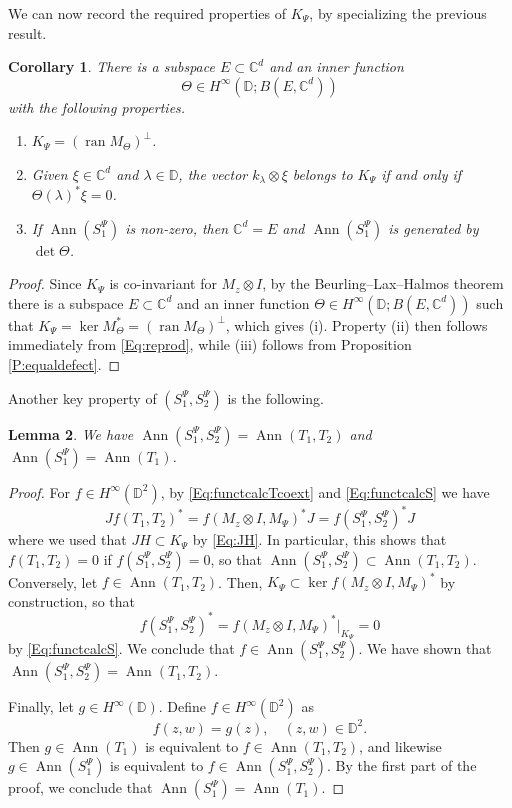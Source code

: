 \documentclass[10pt]{amsart}
\newcommand{\bC}{{\mathbb{C}}}
\newcommand{\bD}{{\mathbb{D}}}
\newcommand{\ran}{\operatorname{ran}}
\newcommand{\Ann}{\operatorname{Ann}}
\newtheorem{lemma}{Lemma}[section]
\newtheorem{corollary}[lemma]{Corollary}
\theoremstyle{definition}
\begin{document}
We can now record the required properties of $K_\Psi$, by specializing the previous result.

\begin{corollary}\label{C:detK}
There is a subspace $E\subset \bC^d$ and an inner function $$\Theta\in H^\infty(\bD;B(E,\bC^d))$$ with the following properties.
\begin{enumerate}[{\rm (i)}]
\item $K_\Psi=(\ran M_\Theta)^\perp$.
\item Given $\xi\in \bC^d$ and $\lambda\in \bD$, the vector $k_\lambda\otimes \xi$ belongs to $K_\Psi$ if and only if $\Theta(\lambda)^*\xi=0$.
\item If $\Ann(S^\Psi_1)$ is non-zero, then $\bC^d=E$ and $\Ann(S^\Psi_1)$ is generated by  $\det \Theta$.
\end{enumerate}
\end{corollary}
\begin{proof}
Since $K_\Psi$ is co-invariant for $M_z\otimes I$, by the Beurling--Lax--Halmos theorem there is a subspace $E\subset \bC^d$ and an inner function $\Theta\in H^\infty(\bD;B(E,\bC^d))$ such that $K_\Psi=\ker M_\Theta^*=(\ran M_\Theta)^\perp$, which gives (i). Property (ii) then follows immediately from \eqref{Eq:reprod}, while (iii) follows from Proposition \ref{P:equaldefect}.
\end{proof}

Another key property of $(S^\Psi_1,S^\Psi_2)$ is the following.

\begin{lemma}\label{L:AnnS}
We have $\Ann(S^\Psi_1,S^\Psi_2)=\Ann(T_1,T_2)$ and $\Ann(S^\Psi_1)=\Ann(T_1)$.
\end{lemma}
\begin{proof}
For $f\in H^\infty(\bD^2)$, by \eqref{Eq:functcalcTcoext} and \eqref{Eq:functcalcS} we have
\[Jf(T_1,T_2)^*=f(M_z\otimes I,M_\Psi)^* J=f(S^\Psi_1,S^\Psi_2)^* J
\]
where we used that $JH\subset K_\Psi$ by \eqref{Eq:JH}. In particular, this shows that $f(T_1,T_2)=0$ if $f(S^\Psi_1,S^\Psi_2)=0$, so that $\Ann(S^\Psi_1,S^\Psi_2)\subset \Ann(T_1,T_2)$. Conversely, let $f\in \Ann(T_1,T_2)$. Then, $K_\Psi\subset \ker f(M_z\otimes I,M_\Psi)^*$ by construction, so that
\[
f(S^\Psi_1,S^\Psi_2)^*=f(M_z\otimes I,M_\Psi)^*|_{K_\Psi}=0
\]
by \eqref{Eq:functcalcS}. We conclude that $f\in\Ann(S^\Psi_1,S^\Psi_2)$. We have shown that $\Ann(S^\Psi_1,S^\Psi_2)=\Ann(T_1,T_2)$.

Finally, let $g\in H^\infty(\bD)$. Define $f\in H^\infty(\bD^2)$ as
\[
f(z,w)=g(z),\quad (z,w)\in \bD^2.
\]
Then $g\in \Ann(T_1)$ is equivalent to $f\in \Ann(T_1,T_2)$, and likewise $g\in \Ann(S^\Psi_1)$ is equivalent to $f\in \Ann(S^\Psi_1,S^\Psi_2)$. By the first part of the proof, we conclude that $\Ann(S^\Psi_1)=\Ann(T_1)$.
\end{proof}
\end{document}
